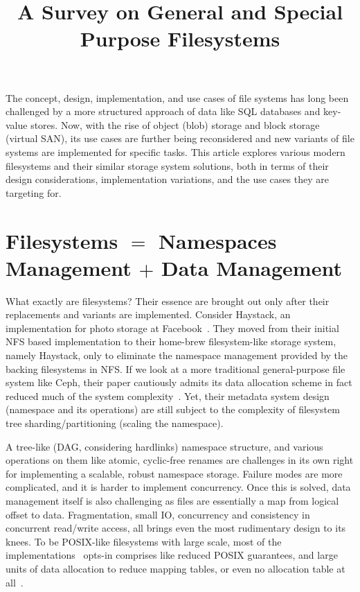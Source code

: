 



\tableofcontents

\title{A Survey on General and Special Purpose Filesystems}
\maketitle

The concept, design, implementation, and use cases of file systems has long
been challenged by a more structured approach of data like SQL databases and
key-value stores. Now, with the rise of object (blob) storage and block
storage (virtual SAN), its use cases are further being reconsidered and new
variants of file systems are implemented for specific tasks. This article
explores various modern filesystems and their similar storage system solutions, both in
terms of their design considerations, implementation variations, and the use
cases they are targeting for.

\section{Filesystems $=$ Namespaces Management $+$ Data Management}
What exactly are filesystems? Their essence are brought out only after their
replacements and variants are implemented. Consider Haystack, an implementation
for photo storage at Facebook~\cite{beaver2010finding}. They moved from their
initial NFS based implementation to their home-brew filesystem-like storage
system, namely Haystack, only to eliminate the namespace management provided by
the backing filesystems in NFS. If we look at a more traditional
general-purpose file system like Ceph, their paper cautiously admits its data
allocation scheme in fact reduced much of the system
complexity~\cite{weil2006ceph}.  Yet, their metadata system design (namespace
and its operations) are still subject to the complexity of filesystem tree
sharding/partitioning (scaling the namespace).

A tree-like (DAG, considering hardlinks) namespace structure, and various
operations on them like atomic, cyclic-free renames are challenges in its own
right for implementing a scalable, robust namespace storage. Failure modes are
more complicated, and it is harder to implement concurrency. Once this is
solved, data management itself is also challenging as files are essentially a
map from logical offset to data. Fragmentation, small IO, concurrency and
consistency in concurrent read/write access, all brings even the most
rudimentary design to its knees. To be POSIX-like filesystems with large scale,
most of the
implementations~\cite{ghemawat2003google,shvachko2010hadoop,weil2006ceph}
opts-in comprises like reduced POSIX guarantees, and large units of data
allocation to reduce mapping tables, or even no allocation table at
all~\cite{weil2006crush}.

